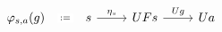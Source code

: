 \[\begin{tikzcd}
	{\varphi_{s,a}(g)} & s & UFs & Ua
	\arrow["{\eta_{s}}", from=1-2, to=1-3]
	\arrow["Ug", from=1-3, to=1-4]
	\arrow["{:=}"{description}, draw=none, from=1-1, to=1-2]
\end{tikzcd}\]